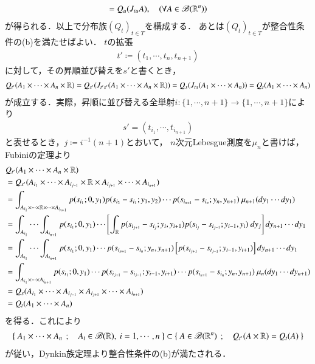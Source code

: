 \begin{prf}
\begin{align}
			= Q_{u}(J_{tu}A),
			\quad (\forall A \in \mathscr{B}(\mathbb{R}^n))
		\end{align}
		が得られる．以上で分布族$(Q_{t})_{t \in T}$を構成する．
		あとは$(Q_{t})_{t \in T}$が整合性条件の(b)を満たせばよい．
		$t$の拡張
		\begin{align}
			t' \coloneqq (t_1,\cdots,t_n,t_{n+1})
		\end{align}
		に対して，その昇順並び替えを$s'$と書くとき，
		\begin{align}
			Q_{t'}(A_1 \times \cdots \times A_n \times \mathbb{R})
			= Q_{s'}(J_{t's'}(A_1 \times \cdots \times A_n \times \mathbb{R}))
			= Q_{s} (J_{ts} (A_1 \times \cdots \times A_n))
			= Q_{t} (A_1 \times \cdots \times A_n)
		\end{align}
		が成立する．実際，昇順に並び替える全単射$i:\{1,\cdots,n+1\} \longrightarrow \{1,\cdots,n+1\}$により
		\begin{align}
			s' = (t_{i_1},\cdots,t_{i_{n+1}})
		\end{align}
		と表せるとき，$j \coloneqq i^{-1}(n+1)$とおいて，
		$n$次元Lebesgue測度を$\mu_n$と書けば，Fubiniの定理より
		\begin{align}
			&Q_{t'}(A_1 \times \cdots \times A_n \times \mathbb{R}) \\
			&=Q_{s'}(A_{i_1} \times \cdots \times A_{i_{j-1}} \times \mathbb{R} \times A_{i_{j+1}} \times \cdots \times A_{i_{n+1}}) \\
			&= \int_{A_{i_1} \times \cdots \times \mathbb{R} \times \cdots \times A_{i_{n+1}}}
			p(s_{i_1};0,y_1)p(s_{i_2} -s_{i_1};y_1,y_2)\cdots p(s_{i_{n+1}}-s_{i_n};y_n,y_{n+1})\ \mu_{n+1}(dy_1 \cdots dy_1) \\
			&= \int_{A_{i_1}}\cdots\int_{A_{i_{n+1}}} p(s_{i_1};0,y_1) \cdots
			\left[ \int_{\mathbb{R}} p(s_{i_{j+1}}-s_{i_j};y_i,y_{i+1}) p(s_{i_j}-s_{i_{j-1}};y_{i-1},y_i)\ dy_j\right]dy_{n+1}\cdots dy_1 \\
			&= \int_{A_{i_1}}\cdots\int_{A_{i_{n+1}}} p(s_{i_1};0,y_1) \cdots p(s_{i_{n+1}}-s_{i_n};y_n,y_{n+1})
			\left[p(s_{i_{j+1}}-s_{i_{j-1}};y_{i-1},y_{i+1})\right]dy_{n+1}\cdots dy_1 \\
			&= \int_{A_{i_1} \times \cdots \times A_{i_{n+1}}} p(s_{i_1};0,y_1) \cdots p(s_{i_{j+1}}-s_{i_{j-1}};y_{i-1},y_{i+1}) \cdots p(s_{i_{n+1}}-s_{i_n};y_n,y_{n+1})\ \mu_n(dy_1 \cdots dy_{n+1}) \\
			&= Q_{s}(A_{i_1} \times \cdots \times A_{i_{j-1}} \times A_{i_{j+1}} \times \cdots \times A_{i_{n+1}}) \\
			&= Q_{t} (A_1 \times \cdots \times A_n)
		\end{align}
		を得る．これにより
		\begin{align}
			\Set{A_1 \times \cdots \times A_n}{A_i \in \borel{\R},\ i=1,\cdots,n}
			\subset \Set{A \in \borel{\R^n}}{Q_{t'}(A \times \R) = Q_{t}(A)}
		\end{align}
		が従い，Dynkin族定理より整合性条件の(b)が満たされる．
		\QED
	\end{prf}